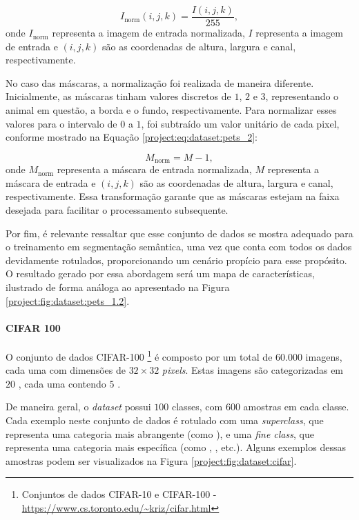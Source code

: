 \begin{equation}
    \label{project:eq:dataset:pets_1}
    I_{\text{norm}}{(i,j,k)} = \frac{I{(i,j,k)}}{255},
\end{equation}
onde $I_{\text{norm}}$ representa a imagem de entrada normalizada, $I$ representa a imagem de entrada e $(i,j,k)$ são as coordenadas de altura, largura e canal, respectivamente.

No caso das máscaras, a normalização foi realizada de maneira diferente. Inicialmente, as máscaras tinham valores discretos de $1$, $2$ e $3$, representando o animal em questão, a borda e o fundo, respectivamente. Para normalizar esses valores para o intervalo de $0$ a $1$, foi subtraído um valor unitário de cada pixel, conforme mostrado na Equação \ref{project:eq:dataset:pets_2}:

\begin{equation}
    \label{project:eq:dataset:pets_2}
    M_{\text{norm}} = M - 1,
\end{equation}
onde $M_{\text{norm}}$ representa a máscara de entrada normalizada, $M$ representa a máscara de entrada e $(i,j,k)$ são as coordenadas de altura, largura e canal, respectivamente. Essa transformação garante que as máscaras estejam na faixa desejada para facilitar o processamento subsequente.

Por fim, é relevante ressaltar que esse conjunto de dados se mostra adequado para o treinamento em segmentação semântica, uma vez que conta com todos os dados devidamente rotulados, proporcionando um cenário propício para esse propósito. O resultado gerado por essa abordagem será um mapa de características, ilustrado de forma análoga ao apresentado na Figura \ref{project:fig:dataset:pets_1.2}.

\paragraph{CIFAR 100}
\label{project:dataset:cifar}
O conjunto de dados CIFAR-100 \footnote{Conjuntos de dados CIFAR-10 e CIFAR-100 - \url{https://www.cs.toronto.edu/~kriz/cifar.html}} \citep{Krizhevsky2014TheDataset} é composto por um total de $60.000$ imagens, cada uma com dimensões de $32 \times 32$ \textit{pixels}. Estas imagens são categorizadas em $20$ , cada uma contendo $5$ .

De maneira geral, o \textit{dataset} possui $100$ classes, com $600$ amostras em cada classe. Cada exemplo neste conjunto de dados é rotulado com uma \textit{superclass}, que representa uma categoria mais abrangente (como ), e uma \textit{fine class}, que representa uma categoria mais específica (como , , etc.). Alguns exemplos dessas amostras podem ser visualizados na Figura \ref{project:fig:dataset:cifar}.


